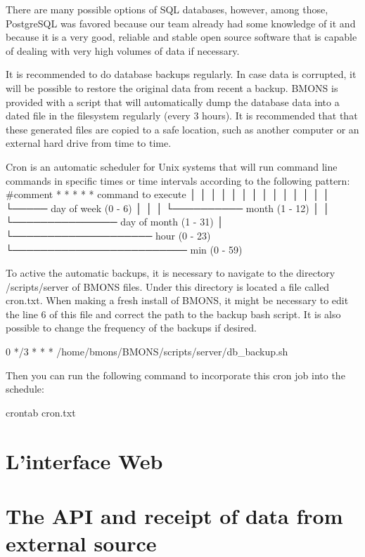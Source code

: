 There are many possible options of SQL databases, however, among those, PostgreSQL was favored because our team already had some knowledge of it and because it is a very good, reliable and stable open source software that is capable of dealing with very high volumes of data if necessary.

It is recommended to do database backups regularly. In case data is corrupted, it will be possible to restore the original data from recent a backup. BMONS is provided with a script that will automatically dump the database data into a dated file in the filesystem regularly (every 3 hours). It is recommended that that these generated files are copied to a safe location, such as another computer or an external hard drive from time to time.

Cron is an automatic scheduler for Unix systems that will run command line commands in specific times or time intervals according to the following pattern:
  #comment
  * * * * *  command to execute
  │ │ │ │ │
  │ │ │ │ │
  │ │ │ │ └───── day of week (0 - 6)
  │ │ │ └────────── month (1 - 12)
  │ │ └─────────────── day of month (1 - 31)
  │ └──────────────────── hour (0 - 23)
  └───────────────────────── min (0 - 59)

To active the automatic backups, it is necessary to navigate to the directory /scripts/server of BMONS files. Under this directory is located a file called cron.txt. When making a fresh install of BMONS, it might be necessary to edit the line 6 of this file and correct the path to the backup bash script. It is also possible to change the frequency of the backups if desired. 
 
0 */3 * * * /home/bmons/BMONS/scripts/server/db_backup.sh

Then you can run the following command to incorporate this cron job into the schedule:

crontab cron.txt

\section{L'interface Web}

\section{The API and receipt of data from external source}

